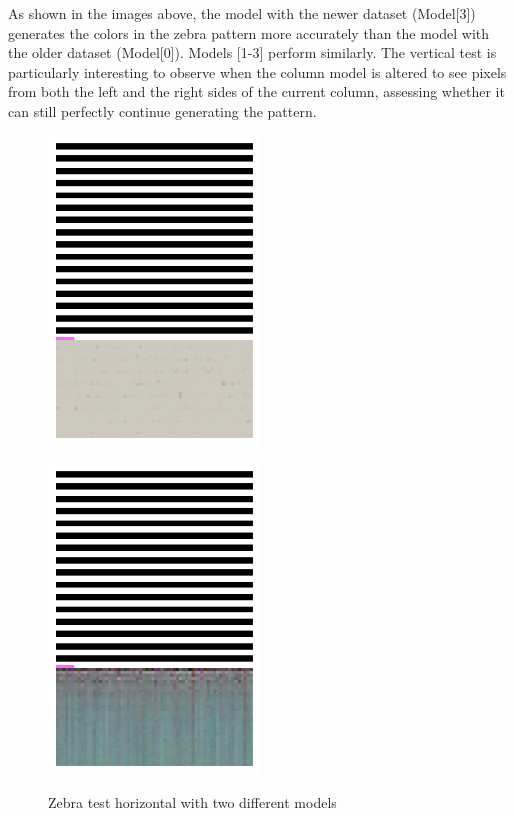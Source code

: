\begin{itemize}
        As shown in the images above, the model with the newer dataset (Model[3]) generates the colors in the zebra pattern more accurately than the model with the older dataset (Model[0]). Models [1-3] perform similarly. The vertical test is particularly interesting to observe when the column model is altered to see pixels from both the left and the right sides of the current column, assessing whether it can still perfectly continue generating the pattern.


        \begin{figure}[H]
            \centering
            \begin{minipage}{0.45\textwidth}
                \centering
                \includegraphics[width=0.5\textwidth]{imgs/ZebraTestH_2.1.7.1_OldData.png} 
                \label{fig:test2_1_M0_Cit}
            \end{minipage}
            \hfill
            \begin{minipage}{0.45\textwidth}
                \centering
                \includegraphics[width=0.5\textwidth]{imgs/ZebraTestH_2.1.8.1_512.png} 
                \label{fig:test2_1_M5_Cit}
            \end{minipage}
            \caption{Zebra test horizontal with two different models}
        \end{figure}


\end{itemize}
